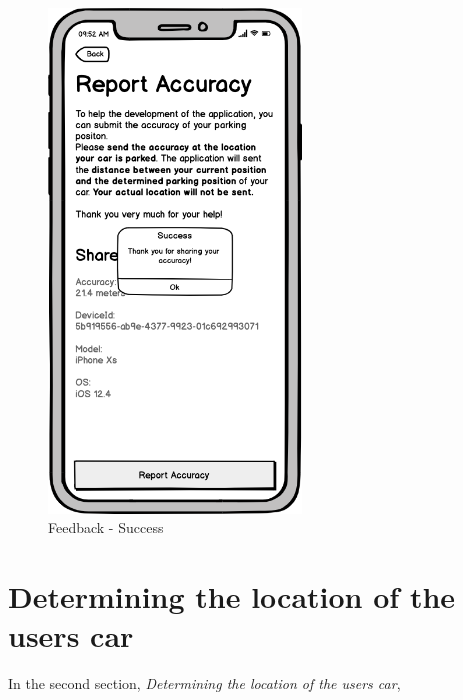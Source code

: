 \begin{figure}[h]
\begin{minipage}[b]{0.49\textwidth}
    \includegraphics[width=0.6\textwidth]{images/UI/Iteration4-Feedback-Success.png}
    \caption{Feedback - Success}
    \label{fig:feedback-succ}
  \end{minipage}
\end{figure}

\section{Determining the location of the users car}
In the second section, \textit{Determining the location of the users car}, 
